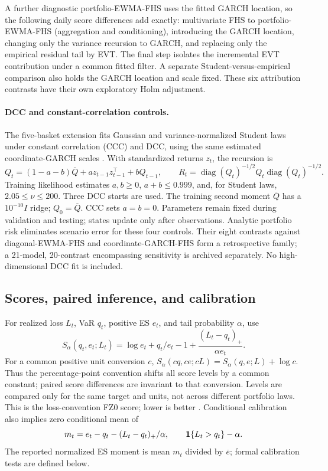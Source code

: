 \documentclass[11pt]{article}
\theoremstyle{definition}\newtheorem{definition}[theorem]{Definition}
\theoremstyle{remark}\newtheorem{remark}[theorem]{Remark}
\begin{document}
A further diagnostic portfolio-EWMA-FHS uses the fitted GARCH location, so the following daily score differences add exactly: multivariate FHS to portfolio-EWMA-FHS (aggregation and conditioning), introducing the GARCH location, changing only the variance recursion to GARCH, and replacing only the empirical residual tail by EVT. The final step isolates the incremental EVT contribution under a common fitted filter. A separate Student-versus-empirical comparison also holds the GARCH location and scale fixed. These six attribution contrasts have their own exploratory Holm adjustment. 

\paragraph{DCC and constant-correlation controls.}
The five-basket extension fits Gaussian and variance-normalized Student laws under constant correlation (CCC) and DCC, using the same estimated coordinate-GARCH scales \citep{engle2002dcc}. With standardized returns $z_t$, the recursion is
\[
Q_t=(1-a-b)\overline Q+a z_{t-1}z_{t-1}^{\top}+bQ_{t-1},\qquad
R_t=\operatorname{diag}(Q_t)^{-1/2}Q_t\operatorname{diag}(Q_t)^{-1/2}.
\]
Training likelihood estimates $a,b\ge0$, $a+b\le0.999$, and, for Student laws, $2.05\le\nu\le200$. Three DCC starts are used. The training second moment $\overline Q$ has a $10^{-10}I$ ridge; $Q_0=\overline Q$. CCC sets $a=b=0$. Parameters remain fixed during validation and testing; states update only after observations. Analytic portfolio risk eliminates scenario error for these four controls. Their eight contrasts against diagonal-EWMA-FHS and coordinate-GARCH-FHS form a retrospective family; a 21-model, 20-contrast encompassing sensitivity is archived separately. No high-dimensional DCC fit is included.


\subsection{Scores, paired inference, and calibration}
For realized loss $L_t$, VaR $q_t$, positive ES $e_t$, and tail probability $\alpha$, use
\begin{equation}\label{eq:fz}
S_\alpha(q_t,e_t;L_t)=\log e_t+q_t/e_t-1+
\frac{(L_t-q_t)_+}{\alpha e_t}.
\end{equation}
For a common positive unit conversion $c$, $S_\alpha(cq,ce;cL)=S_\alpha(q,e;L)+\log c$. Thus the percentage-point convention shifts all score levels by a common constant; paired score differences are invariant to that conversion. Levels are compared only for the same target and units, not across different portfolio laws. This is the loss-convention FZ0 score; lower is better \citep{fissler2016,patton2019}. Conditional calibration also implies zero conditional mean of
\begin{equation}\label{eq:es-moment}
m_t=e_t-q_t-(L_t-q_t)_+/\alpha,
\qquad \mathbf 1\{L_t>q_t\}-\alpha.
\end{equation}
The reported normalized ES moment is mean $m_t$ divided by $\overline e$; formal calibration tests are defined below.
\end{document}
